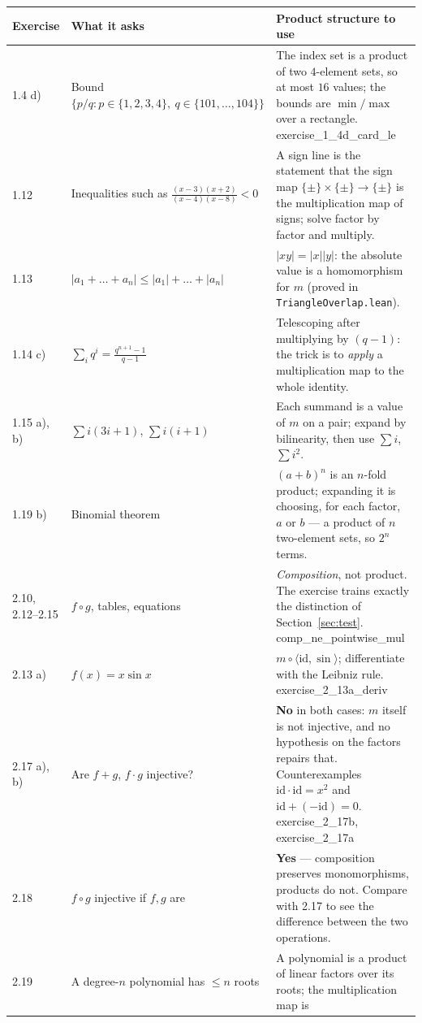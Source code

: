 \documentclass[11pt,a4paper]{article}
\theoremstyle{definition}
\newcommand{\lean}[1]{\textsf{\small #1}}
\begin{document}
\begin{longtable}{@{}p{}p{}p{}@{}}
\toprule
\textbf{Exercise} & \textbf{What it asks} & \textbf{Product structure to use}\\
\midrule
\endhead
1.4 d) & Bound $\{p/q: p\in\{1,2,3,4\},\ q\in\{101,\dots,104\}\}$ &
The index set is a product of two $4$-element sets, so at most $16$ values; the bounds are
$\min/\max$ over a rectangle. \lean{exercise\_1\_4d\_card\_le}\\
1.12 & Inequalities such as $\frac{(x-3)(x+2)}{(x-4)(x-8)}<0$ &
A sign line is the statement that the sign map
$\{\pm\}\times\{\pm\}\to\{\pm\}$ is the multiplication map of signs; solve factor by factor
and multiply.\\
1.13 & $|a_1+\dots+a_n|\le|a_1|+\dots+|a_n|$ &
$|xy|=|x||y|$: the absolute value is a homomorphism for $m$ (proved in
\texttt{TriangleOverlap.lean}).\\
1.14 c) & $\sum_{i} q^i=\frac{q^{n+1}-1}{q-1}$ &
Telescoping after multiplying by $(q-1)$: the trick is to \emph{apply} a multiplication map
to the whole identity.\\
1.15 a), b) & $\sum i(3i+1)$, $\sum i(i+1)$ &
Each summand is a value of $m$ on a pair; expand by bilinearity, then use $\sum i$,
$\sum i^2$.\\
1.19 b) & Binomial theorem &
$(a+b)^n$ is an $n$-fold product; expanding it is choosing, for each factor, $a$ or $b$ ---
a product of $n$ two-element sets, so $2^n$ terms.\\
2.10, 2.12--2.15 & $f\circ g$, tables, equations &
\emph{Composition}, not product.  The exercise trains exactly the distinction of
Section~\ref{sec:test}. \lean{comp\_ne\_pointwise\_mul}\\
2.13 a) & $f(x)=x\sin x$ &
$m\circ\langle \mathrm{id},\sin\rangle$; differentiate with the Leibniz rule.
\lean{exercise\_2\_13a\_deriv}\\
2.17 a), b) & Are $f+g$, $f\cdot g$ injective? &
\textbf{No} in both cases: $m$ itself is not injective, and no hypothesis on the factors
repairs that.  Counterexamples $\mathrm{id}\cdot\mathrm{id}=x^2$ and
$\mathrm{id}+(-\mathrm{id})=0$. \lean{exercise\_2\_17b}, \lean{exercise\_2\_17a}\\
2.18 & $f\circ g$ injective if $f,g$ are &
\textbf{Yes} --- composition preserves monomorphisms, products do not.  Compare with 2.17
to see the difference between the two operations.\\
2.19 & A degree-$n$ polynomial has $\le n$ roots &
A polynomial is a product of linear factors over its roots; the multiplication map is

\end{longtable}
\end{document}

